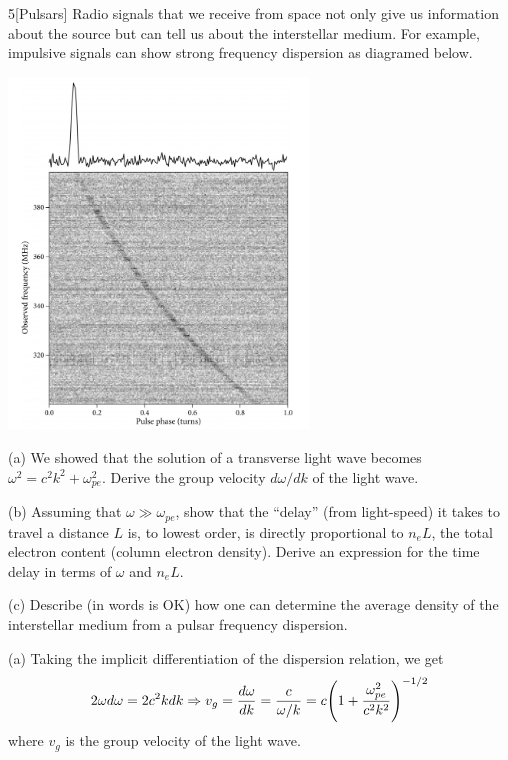 \documentclass[12pt]{article}
\begin{document}
\begin{problem}{5}[Pulsars]
Radio signals that we receive from space not only give us information about the
source but can tell us about the interstellar medium. For example, impulsive
signals can show strong frequency dispersion as diagramed below.
\begin{center}
    \includegraphics[width=0.6\textwidth]{hw3_p5.jpg}
\end{center}

(a) We showed that the solution of a transverse light wave becomes
$\omega^2=c^2k^2+\omega_{pe}^2$. Derive the group velocity $d\omega /dk$ of the
light wave.

(b) Assuming that $\omega\gg\omega_{pe}$, show that the ``delay'' (from
light-speed) it takes to travel a distance $L$ is, to lowest order, is directly
proportional to $n_eL$, the total electron content (column electron density).
Derive an expression for the time delay in terms of $\omega$ and $n_eL$.

(c) Describe (in words is OK) how one can determine the average density of the
interstellar medium from a pulsar frequency dispersion.
\begin{solution}
(a) Taking the implicit differentiation of the dispersion relation, we get
\begin{equation}
    2\omega d\omega=2c^2kdk\Rightarrow v_g=\frac{d\omega}{dk}
    =\frac{c}{\omega/k}=c\qty(1+\frac{\omega_{pe}^2}{c^2k^2})^{-1/2}
\end{equation}
where $v_g$ is the group velocity of the light wave.


\end{solution}
\end{problem}
\end{document}
